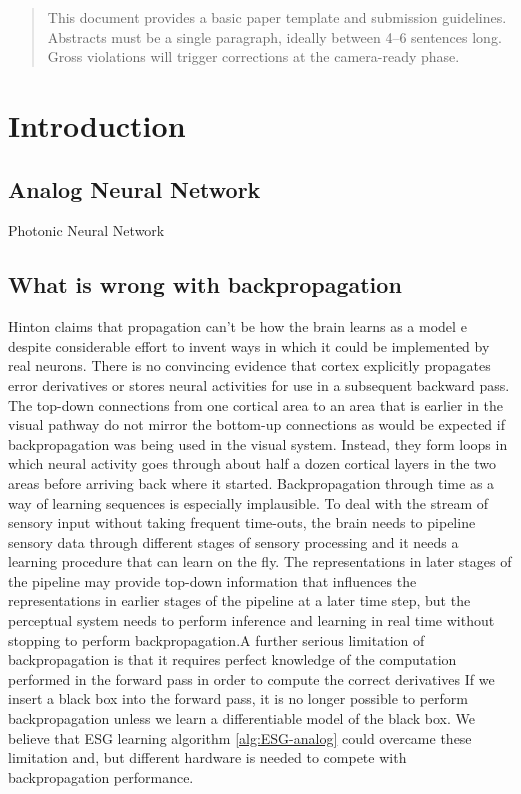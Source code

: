 \documentclass[nohyperref]{article}
\theoremstyle{plain}
\theoremstyle{definition}
\theoremstyle{remark}
\begin{document}
\printAffiliationsAndNotice{}  %

\begin{abstract}
This document provides a basic paper template and submission guidelines.
Abstracts must be a single paragraph, ideally between 4--6 sentences long.
Gross violations will trigger corrections at the camera-ready phase.
\end{abstract}

\section{Introduction}
\subsection{Analog Neural Network}

Photonic Neural Network \cite{Pai_2023}
\subsection{What is wrong with backpropagation}
Hinton claims that propagation can't be how the brain learns as a model e despite considerable effort to
invent ways in which it could be implemented by real neurons. There is no convincing evidence
that cortex explicitly propagates error derivatives or stores neural activities for use in a subsequent
backward pass. The top-down connections from one cortical area to an area that is earlier in the
visual pathway do not mirror the bottom-up connections as would be expected if backpropagation
was being used in the visual system. Instead, they form loops in which neural activity goes through
about half a dozen cortical layers in the two areas before arriving back where it started.
Backpropagation through time as a way of learning sequences is especially implausible. To deal with
the stream of sensory input without taking frequent time-outs, the brain needs to pipeline sensory
data through different stages of sensory processing and it needs a learning procedure that can learn
on the fly. The representations in later stages of the pipeline may provide top-down information
that influences the representations in earlier stages of the pipeline at a later time step, but the
perceptual system needs to perform inference and learning in real time without stopping to perform
backpropagation.A further serious limitation of backpropagation is that it requires perfect knowledge of the computation
performed in the forward pass in order to compute the correct derivatives If we insert a black
box into the forward pass, it is no longer possible to perform backpropagation unless we learn a
differentiable model of the black box.
We believe that ESG learning algorithm \cref{alg:ESG-analog} could overcame these limitation and, but different hardware is needed to compete with backpropagation performance.   
\end{document}
